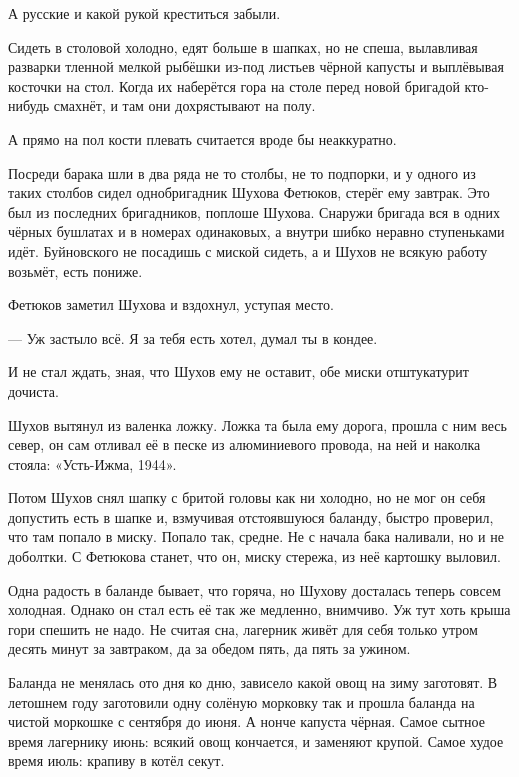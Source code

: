 А русские \dash и какой рукой креститься забыли.

Сидеть в столовой холодно, едят больше в шапках, но не спеша, вылавливая разварки тленной
мелкой рыбёшки из-под листьев чёрной капусты и выплёвывая косточки на стол. Когда их
наберётся гора на столе \dash перед новой бригадой кто-нибудь смахнёт, и там они дохрястывают на
полу.

А прямо на пол кости плевать \dash считается вроде бы неаккуратно.

Посреди барака шли в два ряда не то столбы, не то подпорки, и у одного из таких столбов сидел
однобригадник Шухова Фетюков, стерёг ему завтрак. Это был из последних бригадников, поплоше
Шухова. Снаружи бригада вся в одних чёрных бушлатах и в номерах одинаковых, а внутри шибко
неравно \dash ступеньками идёт. Буйновского не посадишь с миской сидеть, а и Шухов не всякую
работу возьмёт, есть пониже.

Фетюков заметил Шухова и вздохнул, уступая место.

--- Уж застыло всё. Я за тебя есть хотел, думал \dash ты в кондее.

И \dash не стал ждать, зная, что Шухов ему не оставит, обе миски отштукатурит дочиста.

Шухов вытянул из валенка ложку. Ложка та была ему дорога, прошла с ним весь север, он сам
отливал её в песке из алюминиевого провода, на ней и наколка стояла: «Усть-Ижма, 1944».

Потом Шухов снял шапку с бритой головы \dash как ни холодно, но не мог он себя допустить есть в
шапке \dash и, взмучивая отстоявшуюся баланду, быстро проверил, что там попало в миску. Попало
так, средне. Не с начала бака наливали, но и не доболтки. С Фетюкова станет, что он, миску
стережа, из неё картошку выловил.

Одна радость в баланде бывает, что горяча, но Шухову досталась теперь совсем холодная.
Однако он стал есть её так же медленно, внимчиво. Уж тут хоть крыша гори \dash спешить не надо. Не
считая сна, лагерник живёт для себя только утром десять минут за завтраком, да за обедом
пять, да пять за ужином.

Баланда не менялась ото дня ко дню, зависело \dash какой овощ на зиму заготовят. В летошнем году
заготовили одну солёную морковку \dash так и прошла баланда на чистой моркошке с сентября до
июня. А нонче \dash капуста чёрная. Самое сытное время лагернику \dash июнь: всякий овощ кончается, и
заменяют крупой. Самое худое время \dash июль: крапиву в котёл секут.

